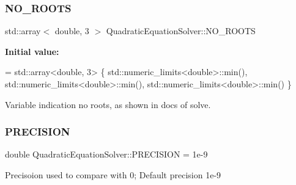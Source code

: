 \mbox{\label{namespaceQuadraticEquationSolver_a58fb06e9e5032bb24dee59668f208036}} 
\subsubsection{\texorpdfstring{N\+O\+\_\+\+R\+O\+O\+TS}{NO\_ROOTS}}
{\footnotesize\ttfamily std\+::array$<$ double, 3 $>$ Quadratic\+Equation\+Solver\+::\+N\+O\+\_\+\+R\+O\+O\+TS}

{\bfseries Initial value\+:}
\begin{DoxyCode}
= std::array<double, 3>    \{
        std::numeric\_limits<double>::min(),
        std::numeric\_limits<double>::min(),
        std::numeric\_limits<double>::min()
    \}
\end{DoxyCode}


Variable indication no roots, as shown in docs of solve. 

\mbox{\label{namespaceQuadraticEquationSolver_ad4a5b33521868e40baa80093d2759dbf}} 
\subsubsection{\texorpdfstring{P\+R\+E\+C\+I\+S\+I\+ON}{PRECISION}}
{\footnotesize\ttfamily double Quadratic\+Equation\+Solver\+::\+P\+R\+E\+C\+I\+S\+I\+ON = 1e-\/9}

Precisoion used to compare with 0; Default precision 1e-\/9 